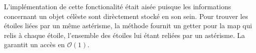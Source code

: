 \documentclass[10pt,a4paper]{report}
\begin{document}
L'implémentation de cette fonctionalité était aisée puisque les informations concernant un objet célèste sont dirèctement stocké en son sein.
Pour trouver les étoiles liées par un même astérisme, la méthode  fournit un getter pour la map  qui relis à chaque étoile, l'ensemble des étoiles lui étant reliées par un astérisme. La  garantit un accès en $\mathcal{O}(1)$.
 
\end{document}
